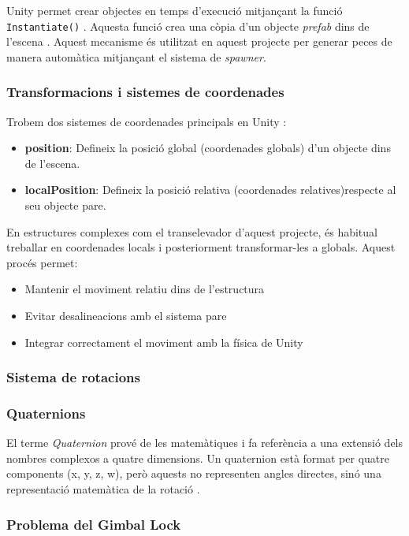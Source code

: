 \documentclass[a4paper,11pt,DIV=13,headings=normal,abstract=true,twoside=semi]{article}
\begin{document}
Unity permet crear objectes en temps d'execució mitjançant la funció \texttt{Instantiate()} \cite{UnityInstantiate}.  Aquesta funció crea una còpia d'un objecte \textit{prefab} dins de l'escena \cite{UnityInstantiate}. Aquest mecanisme és utilitzat en aquest projecte per generar peces de manera automàtica mitjançant el sistema de \textit{spawner}.

\subsubsection{Transformacions i sistemes de coordenades}
Trobem dos sistemes de coordenades principals en Unity \cite{UnityTransformLocalPosition}:
\begin{itemize}
    \item \textbf{position}: Defineix la posició global (coordenades globals) d'un objecte dins de l'escena.
    \item \textbf{localPosition}: Defineix la posició relativa (coordenades relatives)respecte al seu objecte pare. 
\end{itemize}

En estructures complexes com el transelevador d'aquest projecte, és habitual treballar en coordenades locals i posteriorment transformar-les a globals. Aquest procés permet:

\begin{itemize}
\item Mantenir el moviment relatiu dins de l'estructura
\item Evitar desalineacions amb el sistema pare
\item Integrar correctament el moviment amb la física de Unity
\end{itemize}

\subsubsection{Sistema de rotacions}
\subsubsection*{Quaternions}

El terme \textit{Quaternion} prové de les matemàtiques i fa referència a una extensió dels nombres complexos a quatre dimensions. Un quaternion està format per quatre components (x, y, z, w), però aquests no representen angles directes, sinó una representació matemàtica de la rotació \cite{UnityQuaternion}.

\subsubsection*{Problema del Gimbal Lock}
\end{document}

